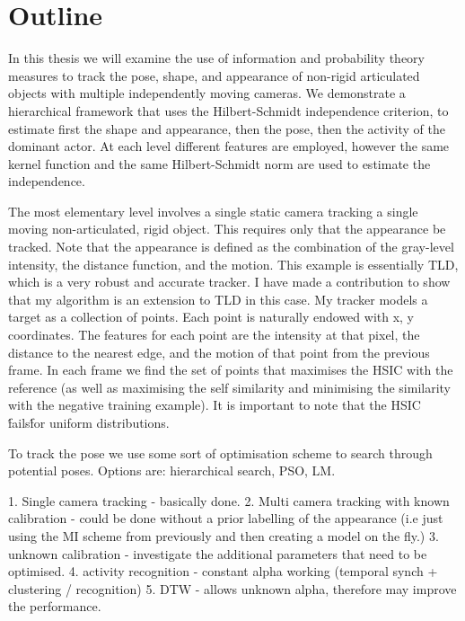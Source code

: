 \chapter{Outline}
\label{outline}

\citet{campbell16}

In this thesis we will examine the use of information and probability theory measures to track the pose, shape, and appearance of non-rigid articulated objects with multiple independently moving cameras. We demonstrate a hierarchical framework that uses the Hilbert-Schmidt independence criterion, to estimate first the shape and appearance, then the pose, then the activity of the dominant actor. At each level different features are employed, however the same kernel function and the same Hilbert-Schmidt norm are used to estimate the independence. 

The most elementary level involves a single static camera tracking a single moving non-articulated, rigid object. This requires only that the appearance be tracked. Note that the appearance is defined as the combination of the gray-level intensity, the distance function, and the motion. This example is essentially TLD, which is a very robust and accurate tracker. I have made a contribution to show that my algorithm is an extension to TLD in this case. My tracker models a target as a collection of points. Each point is naturally endowed with x, y coordinates. The features for each point are the intensity at that pixel, the distance to the nearest edge, and the motion of that point from the previous frame. In each frame we find the set of points that maximises the HSIC with the reference (as well as maximising the self similarity and minimising the similarity with the negative training example). It is important to note that the HSIC \'fails\' for uniform distributions.

To track the pose we use some sort of optimisation scheme to search through potential poses. Options are: hierarchical search, PSO, LM.

1. Single camera tracking - basically done.
2. Multi camera tracking with known calibration - could be done without a prior labelling of the appearance (i.e just using the MI scheme from previously and then creating a model on the fly.)
3. unknown calibration - investigate the additional parameters that need to be optimised. 
4. activity recognition - constant alpha working (temporal synch + clustering / recognition)
5. DTW - allows unknown alpha, therefore may improve the performance.



